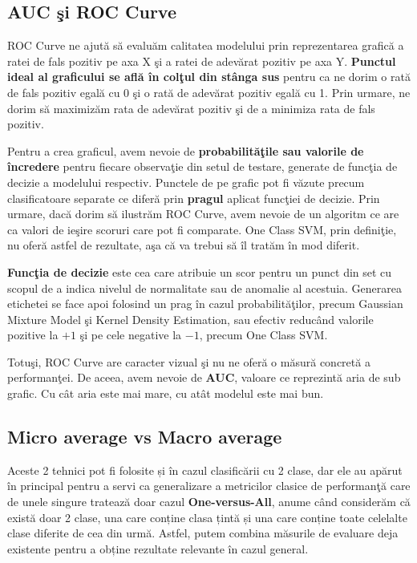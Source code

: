 \subsection{AUC şi ROC Curve}

ROC Curve ne ajută să evaluăm calitatea modelului prin reprezentarea grafică 
a ratei de fals pozitiv pe axa X şi a ratei de adevărat pozitiv pe axa Y. 
\textbf{Punctul 
ideal al graficului se află în colţul din stânga sus} pentru ca ne dorim o 
rată de fals pozitiv egală cu 0 şi o rată de adevărat pozitiv egală cu 1. Prin urmare,
ne dorim să maximizăm rata de adevărat pozitiv şi de a minimiza rata de fals pozitiv.

Pentru a crea graficul, avem nevoie de \textbf{probabilităţile sau valorile de încredere} 
pentru fiecare observaţie din setul de  testare, generate de funcţia de decizie a 
modelului respectiv. Punctele de pe grafic pot fi văzute precum clasificatoare 
separate ce diferă prin \textbf{pragul} aplicat funcţiei de decizie. Prin urmare, dacă
dorim să ilustrăm ROC Curve, avem nevoie de un algoritm ce are ca valori de ieşire
scoruri care pot fi comparate. One Class SVM, prin definiţie, nu oferă astfel de 
rezultate, aşa că va trebui să îl tratăm în mod diferit.

\textbf{Funcţia de decizie} este cea care atribuie un scor pentru 
un punct din set cu scopul de a indica nivelul de normalitate sau de anomalie 
al acestuia. Generarea etichetei se face apoi folosind un prag în cazul 
probabilităţilor, precum Gaussian Mixture Model şi Kernel Density Estimation, 
sau efectiv reducând valorile pozitive la $+1$ şi pe cele negative la $-1$,
precum One Class SVM.

Totuşi, ROC Curve are caracter vizual şi nu ne oferă o măsură concretă a performanţei.
De aceea, avem nevoie de \textbf{AUC}, valoare ce reprezintă aria de sub grafic. Cu cât aria
este mai mare, cu atât modelul este mai bun.

\subsection{Micro average vs Macro average}

Aceste 2 tehnici pot fi folosite și în cazul clasificării cu 2 clase, dar 
ele au apărut în principal pentru a servi ca generalizare a metricilor 
clasice de performanţă care de unele singure tratează 
doar cazul \textbf{One-versus-All}, anume 
când considerăm că există doar 2 clase,
una care conține clasa țintă și una care 
conține toate celelalte clase diferite de cea din urmă. Astfel, putem 
combina măsurile de evaluare deja existente pentru a obține 
rezultate relevante în cazul general.

